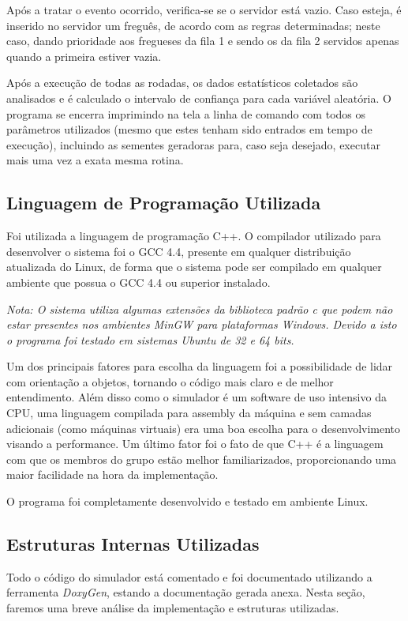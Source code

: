 \documentclass[a4paper,10pt]{article}
\begin{document}
    Após a tratar o evento ocorrido, verifica-se se o servidor está vazio. Caso esteja, é inserido no servidor um freguês, de acordo com as regras determinadas; neste caso, dando prioridade aos fregueses da fila 1 e sendo os da fila 2 servidos apenas quando a primeira estiver vazia.

    Após a execução de todas as rodadas, os dados estatísticos coletados são analisados e é calculado o intervalo de confiança para cada variável aleatória. O programa se encerra imprimindo na tela a linha de comando com todos os parâmetros utilizados (mesmo que estes tenham sido entrados em tempo de execução), incluindo as sementes geradoras para, caso seja desejado, executar mais uma vez a exata mesma rotina.

\subsection{Linguagem de Programação Utilizada}

    Foi utilizada a linguagem de programação C++. O compilador utilizado para desenvolver o sistema foi o GCC 4.4, presente em qualquer distribuição atualizada do Linux, de forma que o sistema pode ser compilado em qualquer ambiente que possua o GCC 4.4 ou superior instalado.

\emph{Nota: O sistema utiliza algumas extensões da biblioteca padrão c que podem não estar presentes nos ambientes MinGW para plataformas Windows. Devido a isto o programa foi testado em sistemas Ubuntu de 32 e 64 bits.}

    Um dos principais fatores para escolha da linguagem foi a possibilidade de lidar com orientação a objetos, tornando o código mais claro e de melhor entendimento. Além disso como o simulador é um software de uso intensivo da CPU, uma linguagem compilada para assembly da máquina e sem camadas adicionais (como máquinas virtuais) era uma boa escolha para o desenvolvimento visando a performance. Um último fator foi o fato de que C++ é a linguagem com que os membros do grupo estão melhor familiarizados, proporcionando uma maior facilidade na hora da implementação.

    O programa foi completamente desenvolvido e testado em ambiente Linux.

\subsection{Estruturas Internas Utilizadas}

    Todo o código do simulador está comentado e foi documentado utilizando a ferramenta \emph{DoxyGen}, estando a documentação gerada anexa. Nesta seção, faremos uma breve análise da implementação e estruturas utilizadas.
\end{document}
